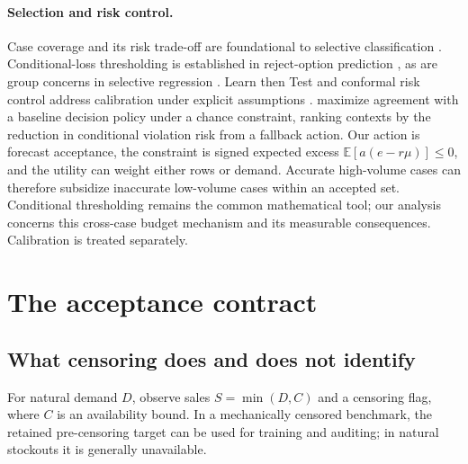 \documentclass{article}
\newcommand{\E}{\mathbb{E}}
\begin{document}
\paragraph{Selection and risk control.}
Case coverage and its risk trade-off are foundational to selective classification \citep{elyaniv2010foundations,geifman2017selective}. Conditional-loss thresholding is established in reject-option prediction \citep{franc2023reject}, as are group concerns in selective regression \citep{shah2022selective}. Learn then Test and conformal risk control address calibration under explicit assumptions \citep{angelopoulos2021ltt,angelopoulos2024crc}. \citet{joshi2026postprocess} maximize agreement with a baseline decision policy under a chance constraint, ranking contexts by the reduction in conditional violation risk from a fallback action. Our action is forecast acceptance, the constraint is signed expected excess $\E[a(e-r\mu)]\leq0$, and the utility can weight either rows or demand. Accurate high-volume cases can therefore subsidize inaccurate low-volume cases within an accepted set. Conditional thresholding remains the common mathematical tool; our analysis concerns this cross-case budget mechanism and its measurable consequences. Calibration is treated separately.

\section{The acceptance contract}


\subsection{What censoring does and does not identify}
For natural demand $D$, observe sales $S=\min(D,C)$ and a censoring flag, where $C$ is an availability bound. In a mechanically censored benchmark, the retained pre-censoring target can be used for training and auditing; in natural stockouts it is generally unavailable.
\end{document}
